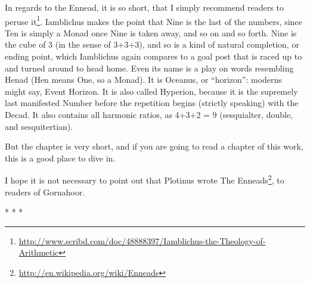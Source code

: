 In regards to the Ennead, it is so short, that I simply recommend readers to peruse it\footnote{\url{http://www.scribd.com/doc/48888397/Iamblichus-the-Theology-of-Arithmetic}}. Iamblichus makes the point that Nine is the last of the numbers, since Ten is simply a Monad once Nine is taken away, and so on and so forth. Nine is the cube of 3 (in the sense of 3+3+3), and so is a kind of natural completion, or ending point, which Iamblichus again compares to a goal post that is raced up to and turned around to head home. Even its name is a play on words resembling Henad (Hen means One, so a Monad). It is Oceanus, or ``horizon'': moderns might say, Event Horizon. It is also called Hyperion, because it is the supremely last manifested Number before the repetition begins (strictly speaking) with the Decad. It also contains all harmonic ratios, as 4+3+2 = 9 (sesquialter, double, and sesquitertian).

But the chapter is very short, and if you are going to read a chapter of this work, this is a good place to dive in.

I hope it is not necessary to point out that Plotinus wrote The Enneads\footnote{\url{http://en.wikipedia.org/wiki/Enneads}}, to readers of Gornahoor.



\begin{center}* * *\end{center}

